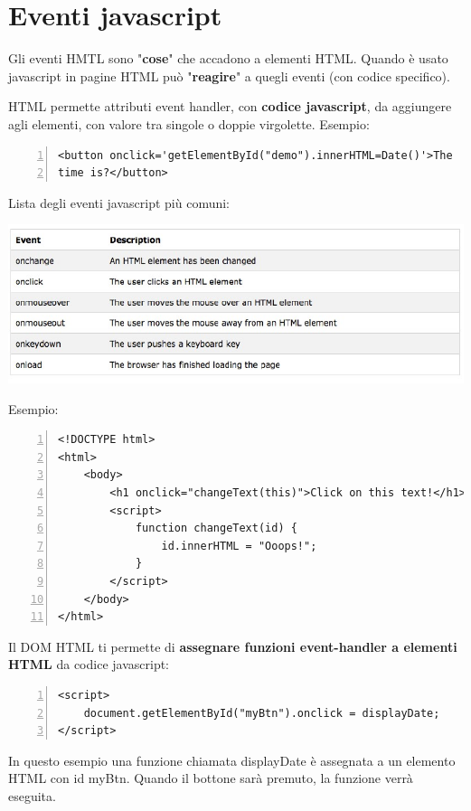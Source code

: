 \section{Eventi javascript}
Gli eventi HMTL sono "\textbf{cose}" che accadono a elementi HTML. Quando è usato javascript in pagine HTML può "\textbf{reagire}" a quegli eventi (con codice specifico).

HTML permette attributi event handler, con \textbf{codice javascript}, da aggiungere agli elementi, con valore tra singole o doppie virgolette. Esempio:
\begin{Verbatim}[numbers = left, frame = single]
<button onclick='getElementById("demo").innerHTML=Date()'>The
time is?</button>
\end{Verbatim}
Lista degli eventi javascript più comuni:
\begin{center}
    \includegraphics[scale=0.6]{Images/TecnologieWeb/8/EventiJavascript.jpg}
\end{center}
Esempio:
\begin{Verbatim}[numbers = left, frame = single]
<!DOCTYPE html>
<html>
    <body>
        <h1 onclick="changeText(this)">Click on this text!</h1>
        <script>
            function changeText(id) {
                id.innerHTML = "Ooops!";
            }
        </script>
    </body>
</html>
\end{Verbatim}
Il DOM HTML ti permette di \textbf{assegnare funzioni event-handler a elementi HTML} da codice javascript:
\begin{Verbatim}[numbers = left, frame = single]
<script>
    document.getElementById("myBtn").onclick = displayDate;
</script>
\end{Verbatim}
In questo esempio una funzione chiamata displayDate è assegnata a un elemento HTML con id myBtn. Quando il bottone sarà premuto, la funzione verrà eseguita.\\

